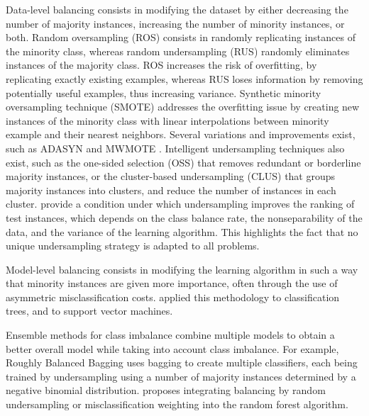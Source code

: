 Data-level balancing consists in modifying the dataset by either decreasing the
number of majority instances, increasing the number of minority instances, or
both. Random oversampling (ROS) consists in randomly replicating instances of
the minority class, whereas random undersampling (RUS) randomly eliminates
instances of the majority class. ROS increases the risk of overfitting, by
replicating exactly existing examples, whereas RUS loses information by removing
potentially useful examples, thus increasing variance. Synthetic minority
oversampling technique (SMOTE) \parencite{chawla2002smote} addresses the
overfitting issue by creating new instances of the minority class with linear
interpolations between minority example and their nearest neighbors. Several
variations and improvements exist, such as ADASYN \parencite{he2008adasyn} and
MWMOTE \parencite{barua2014mwmote}. Intelligent undersampling techniques also
exist, such as the one-sided selection (OSS) \parencite{kubat1997addressing}
that removes redundant or borderline majority instances, or the cluster-based
undersampling (CLUS) \parencite{yen2009cluster} that groups majority instances
into clusters, and reduce the number of instances in each cluster.
\textcite{dal2015undersampling} provide a condition under which undersampling
improves the ranking of test instances, which depends on the class balance rate,
the nonseparability of the data, and the variance of the learning algorithm.
This highlights the fact that no unique undersampling strategy is adapted to all
problems.

Model-level balancing consists in modifying the learning algorithm in such a way
that minority instances are given more importance, often through the use of
asymmetric misclassification costs. \textcite{ting2002instance} applied this
methodology to classification trees, and \textcite{veropoulos1999controlling} to
support vector machines.

Ensemble methods for class imbalance combine multiple models to obtain a better
overall model while taking into account class imbalance. For example, Roughly
Balanced Bagging \parencite{hido2009roughly} uses bagging to create multiple
classifiers, each being trained by undersampling using a number of majority
instances determined by a negative binomial distribution.
\textcite{chen2004using} proposes integrating balancing by random undersampling
or misclassification weighting into the random forest algorithm.

